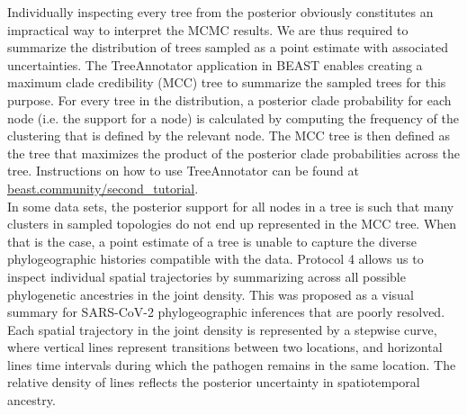 \documentclass{article}
\begin{document}
Individually inspecting every tree from the posterior obviously constitutes an impractical way to interpret the MCMC results. We are thus required to summarize the distribution of trees sampled as a point estimate with associated uncertainties. The TreeAnnotator application in BEAST enables creating a maximum clade credibility (MCC) tree to summarize the sampled trees for this purpose. For every tree in the distribution, a posterior clade probability for each node (i.e. the support for a node) is calculated by computing the frequency of the clustering that is defined by the relevant node. The MCC tree is then defined as the tree that maximizes the product of the posterior clade probabilities across the tree. Instructions on how to use TreeAnnotator can be found at \url{beast.community/second_tutorial}. \\

In some data sets, the posterior support for all nodes in a tree is such that many clusters in sampled topologies do not end up represented in the MCC tree. When that is the case, a point estimate of a tree is unable to capture the diverse phylogeographic histories compatible with the data. Protocol 4 allows us to inspect individual spatial trajectories by summarizing across all possible phylogenetic ancestries in the joint density. This was proposed as a visual summary for SARS-CoV-2 phylogeographic inferences that are poorly resolved. Each spatial trajectory in the joint density is represented by a stepwise curve, where vertical lines represent transitions between two locations, and horizontal lines time intervals during which the pathogen remains in the same location. The relative density of lines reflects the posterior uncertainty in spatiotemporal ancestry.
\end{document}

